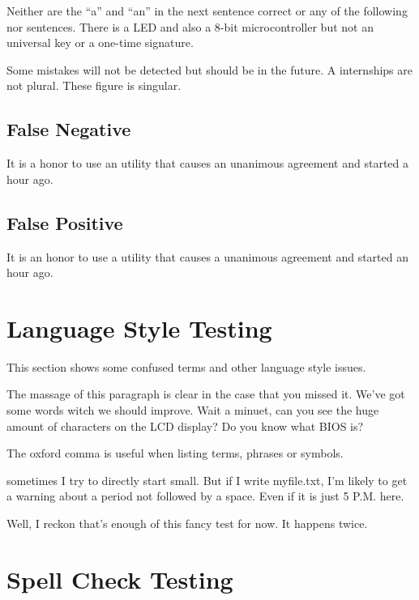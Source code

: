 \documentclass{scrartcl}
\begin{document}
Neither are the “a” and “an” in the next sentence correct or any of the following nor sentences.
There is a LED and also a 8-bit microcontroller but not an universal key or a one-time signature.

Some mistakes will not be detected but should be in the future.
A internships are not plural. These figure is singular.


\subsection{False Negative}
It is a honor to 
use an utility that
causes an unanimous agreement 
and started a hour ago.


\subsection{False Positive}
It is an honor to 
use a utility that
causes a unanimous agreement 
and started an hour ago.



\section{Language Style Testing}
This section shows some confused terms and other language style issues.

The massage of this paragraph is clear in the case that you missed it. We've got some words witch we should improve.
Wait a minuet, can you see the huge amount of characters on the LCD display? 
Do you know what BIOS is?

The oxford comma is useful when listing terms, phrases or symbols.

sometimes I try to directly start small. But if I write myfile.txt, I'm likely to get a warning about a period not followed by a space. Even if it is just 5 P.M. here.

Well, I reckon that's enough of this fancy test for now. It happens twice. 



\section{Spell Check Testing}
\end{document}
